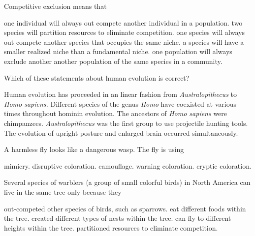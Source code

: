 \question
Competitive exclusion means that

\begin{choices}
\choice one individual will always out compete another individual in a population. 
\choice two species will partition resources to eliminate competition. 
\correctchoice one species will always out compete another species that occupies the same niche.  
\choice a species will have a smaller realized niche than a fundamental niche. 
\choice one population will always exclude another another population of the same species in a community. 
\end{choices}

\question
Which of these statements about human evolution is correct?  

\begin{choices}
\choice Human evolution has proceeded in an linear fashion from \textit{Australopithecus} to \textit{Homo sapiens.}   
\correctchoice Different species of the genus \textit{Homo} have coexisted at various times throughout hominin evolution.   
\choice The ancestors of \textit{Homo sapiens} were chimpanzees.   
\choice \textit{Australopithecus} was the first group to use projectile hunting tools. 
\choice The evolution of upright posture and enlarged brain occurred simultaneously.   
\end{choices}

\question
A harmless fly looks like a dangerous wasp. The fly is using

\begin{choices}
\correctchoice mimicry. 
\choice disruptive coloration. 
\choice camouflage. 
\choice warning coloration. 
\choice cryptic coloration. 
\end{choices}

\question
Several species of warblers (a group of small colorful birds) in North America can live in the same tree only because they

\begin{choices}
\choice out-competed other species of birds, such as sparrows.
\choice eat different foods within the tree.
\choice created different types of nests within the tree.
\choice can fly to different heights within the tree.
\correctchoice partitioned resources to eliminate competition.
\end{choices}
